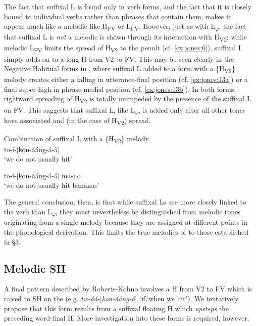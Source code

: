\documentclass[output=paper
,newtxmath
,modfonts
,nonflat]{langsci/langscibook}
\begin{document}
The fact that suffixal L is found only in verb forms, and the fact that it is closely bound to individual verbs rather than phrases that contain them, makes it appear much like a melodic  like H\textsubscript{FV} or L\textsubscript{FV}. However, just as with L\textsubscript{$\varphi $}, the fact that suffixal L is \textit{not} a melodic  is shown through its interaction with H\textsubscript{V2}: while melodic L\textsubscript{FV} limits the spread of H\textsubscript{V2} to the penult (cf. \ref{ex:jones:6}), suffixal L simply adds on to a long H  from V2 to FV. This may be seen clearly in the Negative Habitual forms in , where suffixal L added to a form with a \{H\textsubscript{V2}\} melody creates either a falling  in utterance-final position (cf. \ref{ex:jones:13a}) or a final super-high  in phrase-medial position (cf. \ref{ex:jones:13b}). In both forms, rightward spreading of H\textsubscript{V2} is totally unimpeded by the presence of the suffixal L on FV. This suggests that suffixal L, like L\textsubscript{$\varphi $}, is added only after all other tones have associated and (in the case of H\textsubscript{V2}) spread.

\ea\label{ex:jones:13}
{\label{bkm:Ref359198882}Combination of suffixal L with a \{H\textsubscript{V2}\} melody}\\
\ea\label{ex:jones:13a}
{\label{bkm:Ref359198952}to-í-[kon-ááng-á-â]} \\
\glt ‘we do not usually hit’

\ex\label{ex:jones:13b}
{\label{bkm:Ref359198995}to-í-[kon-ááng-á-\H{a}] ma-i.o}\\
\glt ‘we do not usually hit bananas’
\z
\z

The general conclusion, then, is that while suffixal Ls are more closely linked to the verb than L\textsubscript{$\varphi $},  they must nevertheless be distinguished from melodic tones originating from a single melody because they are assigned at different points in the phonological derivation. This limits the true melodies of  to those established in §3.

\subsection{Melodic SH} 
  A final  pattern described by Roberts-Kohno involves a H  from V2 to FV which is raised to SH on the  (e.g. \textit{tw-áá-}[\textit{kon-ááng-\H{a}}] ‘if/when we hit’). We tentatively propose that this form results from a suffixal floating H  which \textit{upsteps} the preceding word-final H. More investigation into these forms is required, however.
\end{document}
